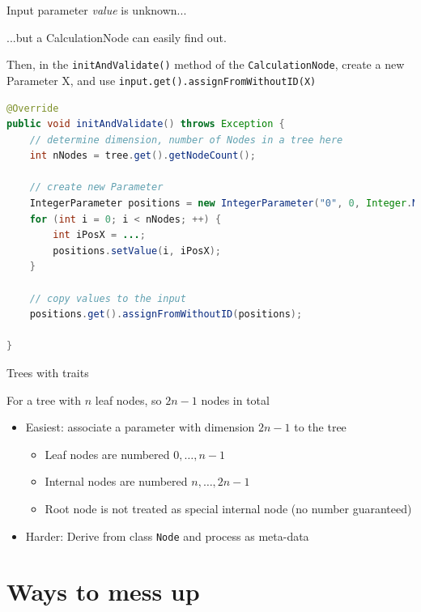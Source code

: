 \documentclass{beamer}
\theoremstyle{definition}
\begin{document}
\begin{frame}[containsverbatim]{Input parameter {\em value} is unknown...}

...but a CalculationNode can easily find out.\vskip 0.5cm

Then, in the {\tt initAndValidate()} method of the {\tt CalculationNode},
create a new Parameter X, and use {\tt input.get().assignFromWithoutID(X)}

\begin{lstlisting}[language=java]
@Override
public void initAndValidate() throws Exception {
    // determine dimension, number of Nodes in a tree here
	int nNodes = tree.get().getNodeCount();

    // create new Parameter
	IntegerParameter positions = new IntegerParameter("0", 0, Integer.MAX_VALUE, nNodes);
	for (int i = 0; i < nNodes; ++) {
		int iPosX = ...;
		positions.setValue(i, iPosX);
	}

    // copy values to the input
	positions.get().assignFromWithoutID(positions);
	
}
\end{lstlisting}

\end{frame}

\begin{frame}[containsverbatim]{Trees with traits}

For a tree with $n$ leaf nodes, so $2n-1$ nodes in total
\begin{itemize}
\item Easiest: associate a parameter with dimension $2n-1$ to the tree
\begin{itemize}
\item Leaf nodes are numbered $0,\ldots,n-1$
\item Internal nodes are numbered $n,\ldots,2n-1$
\item Root node is not treated as special internal node (no number guaranteed)
\end{itemize}
\item Harder: Derive from class {\tt Node} and process as meta-data
\end{itemize}

\end{frame}


\section{Ways to mess up}
\end{document}
